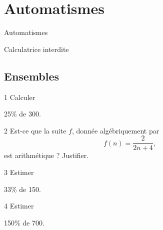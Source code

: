
\SetDate[15/10/2025]



\section{Automatismes}

\begin{frame}

\centering \huge
Automatismes

\large
Calculatrice interdite

\end{frame}

\subsection{Ensembles}

\begin{frame}{1\vspace{-32pt}}
	Calculer
		\begin{center}
			25\% de 300.
		\end{center}
\end{frame}

\begin{frame}{2\vspace{-32pt}}
	Est-ce que la suite $f$, donnée algébriquement par
		\[ f(n) = \dfrac{2}{2n+4}, \]
	est arithmétique ?
	Justifier.
\end{frame}

\begin{frame}{3\vspace{-32pt}}
	Estimer
		\begin{center}
			33\% de 150.
		\end{center}
\end{frame}

\begin{frame}{4\vspace{-32pt}}
	Estimer
		\begin{center}
			150\% de 700.
		\end{center}
\end{frame}

